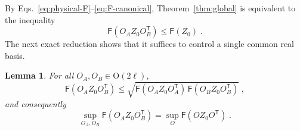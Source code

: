 \documentclass[prx,twocolumn,superscriptaddress,aps,10pt, frontmatterverbose, reprint,footinbib,longbibliography=true]{revtex4-2}
\newtheorem{lemma}{Lemma}
\newcommand{\trans}{\mathsf{T}}
\begin{document}
By Eqs.~\eqref{eq:physical-F}--\eqref{eq:F-canonical}, Theorem~\ref{thm:global} is equivalent to the inequality
\begin{equation}
    \mathsf{F}(O_AZ_0O_B^{\trans})\le \mathsf{F}(Z_0)\;.
    \label{eq:Cartan-target}
\end{equation}
The next exact reduction shows that it suffices to control a single common real basis.

\begin{lemma}
\label{lem:two-to-one}
For all $O_A,O_B\in \mathrm{O}(2\ell)$,
\begin{equation}
    \mathsf{F}\!\left(O_AZ_0O_B^{\trans}\right)\le\sqrt{\mathsf{F}\!\left(O_AZ_0O_A^{\trans}\right)\,\mathsf{F}\!\left(O_BZ_0O_B^{\trans}\right)}\;,
    \label{eq:two-to-one}
\end{equation}
and consequently
\begin{equation}
    \sup_{O_A,O_B}\mathsf{F}\!\left(O_AZ_0O_B^{\trans}\right)=\sup_{O}\mathsf{F}\!\left(OZ_0O^{\trans}\right)\;.
    \label{eq:sup-two-to-one}
\end{equation}
\end{lemma}
\end{document}
